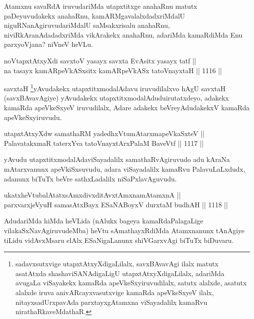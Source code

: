 \begin{artha}
Atamxnu savaRdA iruvudariMda utapxtitxge anahaRnu matutx paDeyuvudakekx anahaRnu, kamARMgavalalxdadxriMdalU niguRNa\-\break nAgiruvudariMdalU saMsakxrisalu anahaRnu, niviRkAranAdadadxriMda vikArakekx anahaRnu, adariMda kamaRdiMda Enu parxyoVjana? niVneV heVLu.
\end{artha}

\begin{shl}
noVtapxtAtxyXdi savxtoV yasayx savxta EvAsitx yasayx tatf || \\
na tasayx kamARpeVkASx\s sitx kamARpeVkASx tatoV\s nayxtaH \hfill || 1116 ||  
\end{shl}

\begin{artha}
savxtaH \footnote{sadavxsutxvige utapxtAtxyXdigaLilalx, savxBAvavAgi ilalx matutx asatAtxda shashaviSANAdigaLigU utapxtAtxyXdigaLilalx, adariMda avugaLa viSayakekx kamaRda apeVkeSxyiruvudilalx, satutx alalxde, asatutx alalxde iruva anivARcayxvasutxvige kamaRda apeVkeSxyeV ilalx, nitayxsadUrxpavAda parxtayxgAtamxna viSayadalilx kamaRvu nirathaRkaveMdathaR.}yAvudakekx utapxtitxmodalAdavu iruvudilalxvo hAgU savxtaH (savxBAvavAgiye) yAvudakekx utapxtitxmodalAdudu\break irutatxdeyo, adakekx kamaRda apeVkeSxyeV iruvudilalx, Adare adakekx beVreyAdudakekxV kamaRda apeVkeSxyiruvudu.
\end{artha}


\begin{shl}
utapxtAtxyXdw samathaRM yadedhxVtumAtarxmapeVkaSxteV ||  \\
PalavatakxmaR taterxYva tatoV\s nayxtArxPalaM BaveVtf \hfill || 1117 ||  
\end{shl}

\begin{artha}
yAvudu utapxtitxmodalAdaviSayadalilx samathaRvAgiruvudo adu kAraNa mAtarxvanunx 
apeVkiSxsuvudu, adara viSayadalilx kamaRvu PalavuLaLxdudx, adanunx biTuTx beVre 
sathxLadalilx niSaPxlavAguvudu.
\end{artha}

\begin{shl}
ukatxheVtubalAtatxsAmxdivxditAvx\s \s tAmxnamAtamxnA ||  \\
parxvarxjeVyuH samasAtxBayx ESaNABoyxV durxtaM budhAH \hfill || 1118 ||  
\end{shl}

\begin{artha}
AdudariMda hiMda heVLida (nAlukx bageya kamaRdaPalagaLige vilakaSxNavAgiruvudeMba) heVtu sAmathayxRdiMda Atamxnanunx tAnAgiye tiLidu vidAvxMsaru elAlx ESaNigaLanunx shiVGarxvAgi biTuTx biDuvaru.
\end{artha}

